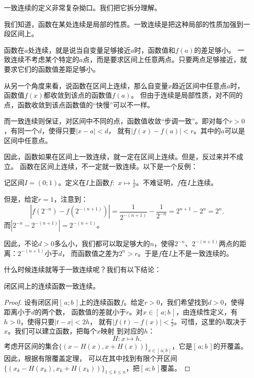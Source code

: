 \documentclass[12pt,UTF8,fontset=none]{ctexbook}
\begin{document}
\begin{appendix}
一致连续的定义非常复杂拗口。我们把它拆分理解。

我们知道，函数在某处连续是局部的性质。一致连续是把这种局部的性质加强到一段区间上。

函数在$a$处连续，就是说当自变量足够接近$a$时，函数值和$f(a)$的差足够小。
一致连续不考虑某个特定的$a$点，而是要求区间上任意两点。只要两点足够接近，就要求它们的函数值差距足够小。

从另一个角度来看，说函数在区间上连续，那么自变量$x$趋近区间中任意点$a$时，函数值$f(x)$都收敛到该点的函数值$f(a)$。
但由于连续是局部性质，对不同的点，函数收敛到该点函数值的“快慢”可以不一样。

而一致连续则保证，对区间中不同的点，函数值收敛“步调一致”。即对每个$r>0$，有同一个$d$，使得只要$|x - a| < d$，
就有$|f(x) - f(a)| < r$。其中的$a$可以是区间中任意点。

因此，函数如果在区间上一致连续，就一定在区间上连续。但是，反过来并不成立。
函数在区间上连续，不一定就一致连续。以下是一个反例：

\begin{ex}
    记区间$I = (0; 1)$。定义在$I$上函数$f: \,\,x \mapsto \frac{1}{x}$。不难证明，$f$在$I$上连续。

    但是，给定$r = 1$，注意到：
    $$ \left|f\left(2^{-n}\right) - f\left(2^{-(n+1)}\right)\right| = \frac{1}{2^{-(n+1)}} - \frac{1}{2^{-n}} = 2^{n+1} - 2^{n} = 2^n. $$
    而$\left|2^{-n} - 2^{-(n+1)}\right| = 2^{-(n+1)}$。

    因此，不论$d>0$多么小，我们都可以取足够大的$n$，使得$2^{-n}$、$2^{-(n+1)}$两点的距离：$2^{-(n+1)}$小于$d$，
    而函数值之差为$2^n > r$。于是$f$在$I$上不是一致连续的。
\end{ex}

什么时候连续就等于一致连续呢？我们有以下结论：

\begin{tm}
    闭区间上的连续函数一致连续。
\end{tm}
\begin{proof}
    设有闭区间$[\,a;b\,]$上的连续函数$f$。给定$r>0$，我们希望找到$d>0$，使得距离小于$d$的两个数，
    函数值的差就小于$r$。对$x\in[\,a; b\,]$，由连续性定义，有$h>0$，使得只要$|t - x| < 2h$，
    就有$|f(t) - f(x)| < \frac{r}{2}$。可惜，这里的$h$取决于$x$。我们可以建立函数，把每个$x$映射
    到对应的$h$：
    $$ H: x \mapsto h. $$
    考虑开区间的集合$\{(x - H(x), x + H(x))\}_{x\in[\,a; b\,]}$，它是$[\,a; b\,]$的开覆盖。因此，根据有限覆盖定理，
    可以在其中找到有限个开区间$\{(x_k - H(x_k), x_k + H(x_k))\}_{1\leqslant k\leqslant n}$，把$[\,a; b\,]$覆盖。
    

\end{proof}
\end{appendix}
\end{document}
